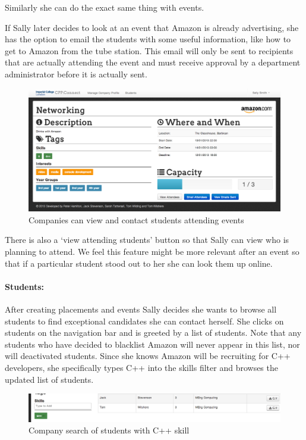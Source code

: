    Similarly she can do the exact same thing with events.

    If Sally later decides to look at an event that Amazon is already advertising, she has the option to email the students with some useful information, like how to get to Amazon from the tube station.
    This email will only be sent to recipients that are actually attending the event and must receive approval by a department administrator before it is actually sent.

    \begin{figure}[H]\centering
    \includegraphics[scale=0.5]{images/user_experiences/company/networking_event}
    \caption{Companies can view and contact students attending events}
    \end{figure}

    There is also a `view attending students' button so that Sally can view who is planning to attend. We feel this feature might be more relevant after an event so that if a particular student stood out to her she can look them up online.

  \paragraph{Students:}
    After creating placements and events Sally decides she wants to browse all students to find exceptional candidates she can contact herself. She clicks on students on the navigation bar and is greeted by a list of students. Note that any students who have decided to blacklist Amazon will never appear in this list, nor will deactivated students.
    Since she knows Amazon will be recruiting for C++ developers, she specifically types C++ into the skills filter
    and browses the updated list of students.

    \begin{figure}[H]\centering
    \includegraphics[scale=0.5]{images/user_experiences/company/c++_student_search}
    \caption{Company search of students with C++ skill}
    \end{figure}

